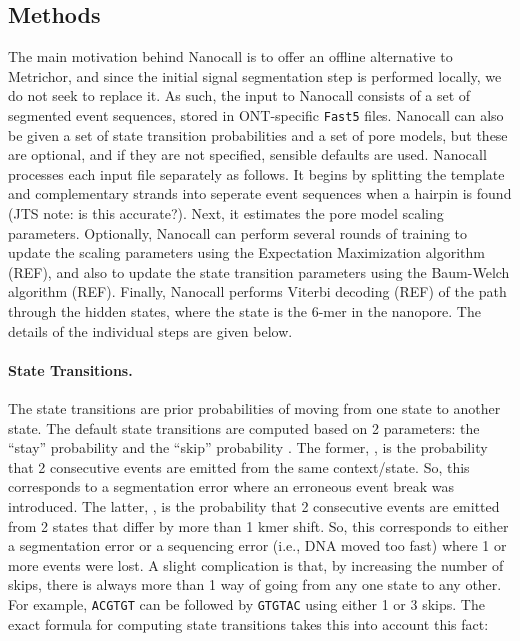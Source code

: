 \documentclass{bioinfo}
\begin{document}

\begin{methods}
\section{Methods}

The main motivation behind Nanocall is to offer an offline alternative to Metrichor, and since the initial signal segmentation step is performed locally, we do not seek to replace it. As such, the input to Nanocall consists of a set of segmented event sequences, stored in ONT-specific \texttt{Fast5} files. Nanocall can also be given a set of state transition probabilities and a set of pore models, but these are optional, and if they are not specified, sensible defaults are used. Nanocall processes each input file separately as follows. It begins by splitting the template and complementary strands into seperate event sequences when a hairpin is found (JTS note: is this accurate?). Next, it estimates the pore model scaling parameters. Optionally, Nanocall can perform several rounds of training to update the scaling parameters using the Expectation Maximization algorithm (REF), and also to update the state transition parameters using the Baum-Welch algorithm (REF). Finally, Nanocall performs Viterbi decoding (REF) of the path through the hidden states, where the state is the 6-mer in the nanopore. The details of the individual steps are given below.

\paragraph{State Transitions.}
The state transitions are prior probabilities of moving from one state to another state. The default state transitions are computed based on 2 parameters: the ``stay'' probability \pstay and the ``skip'' probability \pskip. The former, \pstay, is the probability that 2 consecutive events are emitted from the same context/state. So, this corresponds to a segmentation error where an erroneous event break was introduced. The latter, \pskip, is the probability that 2 consecutive events are emitted from 2 states that differ by more than 1 kmer shift. So, this corresponds to either a segmentation error or a sequencing error (i.e., DNA moved too fast) where 1 or more events were lost. A slight complication is that, by increasing the number of skips, there is always more than 1 way of going from any one state to any other. For example, \texttt{ACGTGT} can be followed by \texttt{GTGTAC} using either 1 or 3 skips. The exact formula for computing state transitions takes this into account this fact:


\end{methods}
\end{document}
